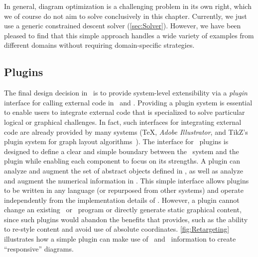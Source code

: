 In general, diagram optimization is a challenging problem in its own right, which we of course do not aim to solve conclusively in this chapter.  Currently, we just use a generic constrained descent solver (\cref{sec:Solver}).  However, we have been pleased to find that this simple approach handles a wide variety of examples from different domains without requiring domain-specific strategies.


\subsection{Plugins}
\label{sec:PlugInDesign}





The final design decision in \Penrose\ is to provide system-level extensibility via a \textit{plugin} interface for calling external code in \Substance\ and \Style. Providing a plugin system is essential to enable users to integrate external code that is specialized to solve particular logical or graphical challenges. In fact, such interfaces for integrating external code are already provided by many systems (\eg \TeX, \emph{Adobe Illustrator}, and TikZ's plugin system for graph layout algorithms~\cite{Graphviz}). The interface for \Penrose\ plugins is designed to define a clear and simple boundary between the \Penrose\ system and the plugin while enabling each component to focus on its strengths. A plugin can analyze and augment the set of abstract objects defined in \Substance{}, as well as analyze and augment the numerical information in \Style. This simple interface allows plugins to be written in any language (or repurposed from other systems) and operate independently from the implementation details of \Penrose. However, a plugin cannot change an existing \Substance\ or \Style\ program or directly generate static graphical content, since such plugins would abandon the benefits that \Penrose{} provides, such as the ability to re-style content and avoid use of absolute coordinates. \cref{fig:Retargeting} illustrates how a simple plugin can make use of \Substance\ and \Style\ information to create ``responsive'' diagrams.

